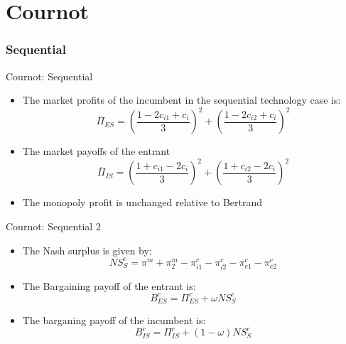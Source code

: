 \documentclass{beamer}
\numberwithin{equation}{section}
\begin{document}
\section{Cournot}

\subsubsection{Sequential}
\begin{frame}{Cournot: Sequential}
\begin{itemize}
    \item The market profits of the incumbent in the sequential technology case is:
    \begin{equation*}
        \overline{\Pi}_{ES} =
        \left(\frac{1-2 c_{i1}+c_{i}}{3}  \right)^2
        +
        \left(\frac{1-2 c_{i2}+c_{i}}{3}  \right)^2
    \end{equation*}
    \item The market payoffs of the entrant 
    \begin{equation*}
        \overline{\Pi}_{IS} =  
\left(\frac{1+ c_{i1}-2c_{i}}{3}  \right)^2
+ \left(\frac{1+ c_{i2}-2c_{i}}{3}  \right)^2
    \end{equation*}
    \item The monopoly profit is unchanged relative to Bertrand
\end{itemize}
\end{frame}

\begin{frame}{Cournot: Sequential 2}
\begin{itemize}
\item The Nash surplus is given by:
\begin{equation*}
NS_{S}^{c} = \pi^m+\pi^m_{2}- \pi_{i1}^{c}-\pi_{i2}^{c}-\pi_{e1}^{c}-\pi_{e2}^{c}
\end{equation*}

\item The Bargaining payoff of the entrant is: 
\begin{equation*}
B_{ES}^{c} = \Pi_{ES}^{c} + \omega NS_{S}^{c} 
\end{equation*}
    
\item The barganing payoff of the incumbent is: \begin{equation*}
B_{IS}^{c} = \Pi_{IS}^{c}+ (1-\omega) NS_{S}^{c}
\end{equation*}
\end{itemize}
\end{frame}
\end{document}
